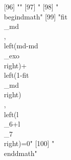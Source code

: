  [96] ""                                                                                                                                                                                                                                                                                                                                                                                                                                                                                            
 [97] "%
 [98] "\\begin{dmath}"                                                                                                                                                                                                                                                                                                                                                                                                                                                                              
 [99] "{{fit\\_md}}\\, \\left({md}-{{md\\_exo}}\\right)+\\left(1-{{fit\\_md}}\\right)\\, \\left({{l\\_6}}+{{l\\_7}}\\right)=0"                                                                                                                                                                                                                                                                                                                                                                      
[100] "\\end{dmath}"                                                                                                                                                                                                                                                                                                                                                                                                                                                                                
